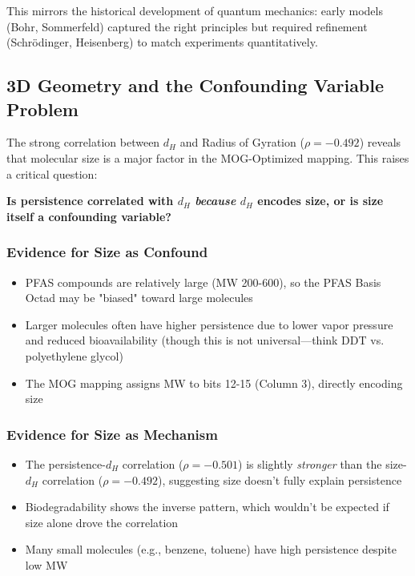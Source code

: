\documentclass[11pt,letterpaper]{article}
\begin{document}
This mirrors the historical development of quantum mechanics: early models (Bohr, Sommerfeld) captured the right principles but required refinement (Schrödinger, Heisenberg) to match experiments quantitatively.

\subsection{3D Geometry and the Confounding Variable Problem}

The strong correlation between $d_H$ and Radius of Gyration ($\rho = -0.492$) reveals that molecular size is a major factor in the MOG-Optimized mapping. This raises a critical question:

\textbf{Is persistence correlated with $d_H$ \textit{because} $d_H$ encodes size, or is size itself a confounding variable?}

\subsubsection{Evidence for Size as Confound}

\begin{itemize}
    \item PFAS compounds are relatively large (MW 200-600), so the PFAS Basis Octad may be "biased" toward large molecules
    \item Larger molecules often have higher persistence due to lower vapor pressure and reduced bioavailability (though this is not universal—think DDT vs. polyethylene glycol)
    \item The MOG mapping assigns MW to bits 12-15 (Column 3), directly encoding size
\end{itemize}

\subsubsection{Evidence for Size as Mechanism}

\begin{itemize}
    \item The persistence-$d_H$ correlation ($\rho = -0.501$) is slightly \textit{stronger} than the size-$d_H$ correlation ($\rho = -0.492$), suggesting size doesn't fully explain persistence
    \item Biodegradability shows the inverse pattern, which wouldn't be expected if size alone drove the correlation
    \item Many small molecules (e.g., benzene, toluene) have high persistence despite low MW
\end{itemize}
\end{document}
